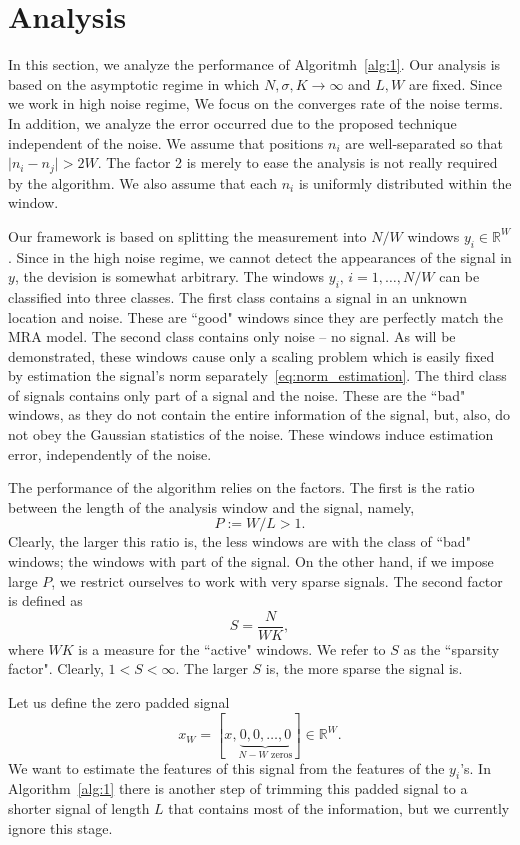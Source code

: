 \documentclass[journal]{IEEEtran}
\numberwithin{equation}{section}
\numberwithin{figure}{section}
\theoremstyle{plain}
\theoremstyle{definition}
\theoremstyle{remark}
\theoremstyle{plain}
\theoremstyle{remark}
\theoremstyle{plain}
\theoremstyle{plain}
\newcommand{\RW}{\mathbb{R}^W}
\begin{document}
\section{Analysis} \label{sec:analysis}

In this section, we analyze the performance of Algoritmh~\ref{alg:1}. Our analysis is based on the asymptotic regime in which  $N,\sigma,K\to\infty$ and  $L,W$ are fixed. Since we work in high noise regime, We focus on the converges rate of the noise terms. In addition, we analyze the error occurred due to the proposed technique independent of the noise.
 We assume that positions $n_i$ are well-separated so that $\vert n_i - n_j\vert >2W$. The factor 2 is merely to ease the analysis is not really required by the algorithm. We also assume that each $n_i$ is uniformly distributed within the window. 


Our framework is based on splitting the measurement into $N/W$ windows $y_i\in\RW$. Since in the high noise regime, we cannot detect the appearances of the signal in $y$, the devision is somewhat arbitrary. The windows $y_i,\,i=1,\ldots,N/W$ can be classified into three classes.  The first class contains a signal in an unknown location and noise. These are ``good" windows since they are perfectly match the MRA model. The second class contains only noise -- no signal.  As will be demonstrated, these windows cause only a scaling problem which is easily fixed by estimation the signal's norm separately~\eqref{eq:norm_estimation}. The third class of signals contains only part of a signal and the noise. These are the ``bad" windows, as they do not contain the entire information of the signal, but, also, do not obey the Gaussian statistics of the noise. These windows induce estimation error, independently of the noise.  

The performance of the algorithm relies on the factors.  The first is the ratio between the length of the analysis window and the signal, namely, 
$$P := W/L>1.$$ Clearly, the larger this ratio is, the less windows are with the class of ``bad" windows; the windows with part of the signal.  On the other hand, if we impose large $P$, we restrict ourselves to work with very sparse signals. The second factor is defined as $$S = \frac{N}{WK},$$ where $WK$ is a measure for the ``active" windows. We refer to $S$ as the  ``sparsity factor". Clearly,  $1<S<\infty$. The larger $S$ is, the more sparse the signal is.


Let us define  the zero padded signal $$x_W  = [x, \underbrace{0,0,\ldots,0}_{N-W \text{ zeros}}]\in\mathbb{R}^W.$$ 
We want to estimate the features of this signal from the features of the $y_i$'s.
In Algorithm~\ref{alg:1} there is another step of trimming this padded signal to a shorter signal of length $L$ that contains most of the information, but we currently ignore this stage. 
 
\end{document}
